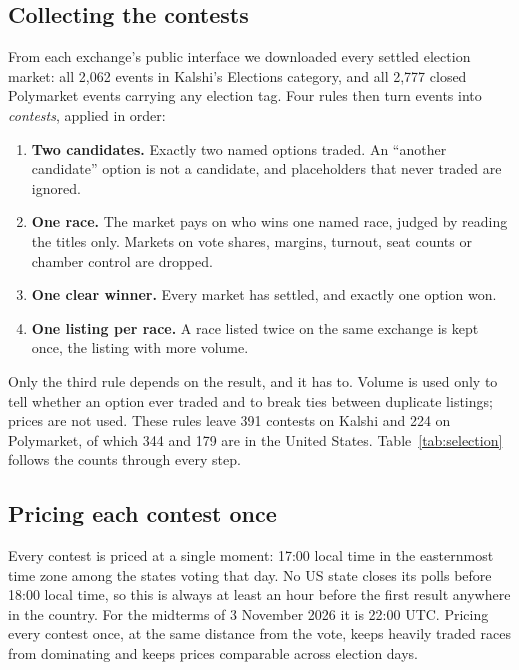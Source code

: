 \subsection{Collecting the contests}

From each exchange's public interface we downloaded every settled election market: all 2{,}062 events in Kalshi's
Elections category, and all 2{,}777 closed Polymarket events carrying any election tag. Four rules then turn events into
\emph{contests}, applied in order:
\begin{enumerate}
  \item \textbf{Two candidates.} Exactly two named options traded. An ``another candidate'' option is not a candidate,
        and placeholders that never traded are ignored.
  \item \textbf{One race.} The market pays on who wins one named race, judged by reading the titles only. Markets on
        vote shares, margins, turnout, seat counts or chamber control are dropped.
  \item \textbf{One clear winner.} Every market has settled, and exactly one option won.
  \item \textbf{One listing per race.} A race listed twice on the same exchange is kept once, the listing with more
        volume.
\end{enumerate}
Only the third rule depends on the result, and it has to. Volume is used only to tell whether an option ever traded
and to break ties between duplicate listings; prices are not used. These rules leave 391 contests on Kalshi and 224 on
Polymarket, of which 344 and 179 are in the United States. Table~\ref{tab:selection} follows the counts through every
step.

\subsection{Pricing each contest once}

Every contest is priced at a single moment: 17:00 local time in the easternmost time zone among the states voting that
day. No US state closes its polls before 18:00 local time, so this is always at least an hour before the first result
anywhere in the country. For the midterms of 3 November 2026 it is 22:00 UTC. Pricing every contest once, at the same
distance from the vote, keeps heavily traded races from dominating and keeps prices comparable across election days.

